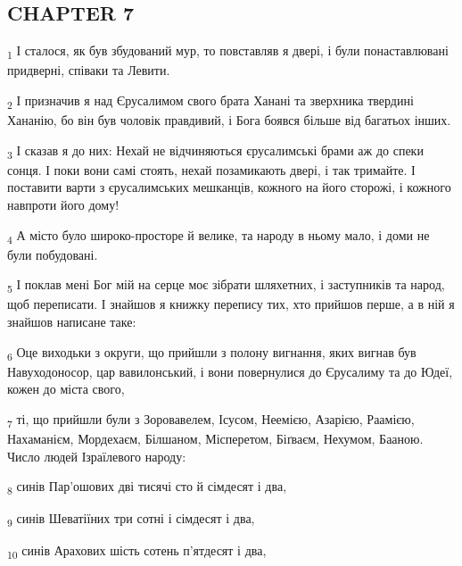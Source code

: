 \subsection{CHAPTER 7}
\begin{tcolorbox}
\textsubscript{1} І сталося, як був збудований мур, то повставляв я двері, і були понаставлювані придверні, співаки та Левити.
\end{tcolorbox}
\begin{tcolorbox}
\textsubscript{2} І призначив я над Єрусалимом свого брата Ханані та зверхника твердині Хананію, бо він був чоловік правдивий, і Бога боявся більше від багатьох інших.
\end{tcolorbox}
\begin{tcolorbox}
\textsubscript{3} І сказав я до них: Нехай не відчиняються єрусалимські брами аж до спеки сонця. І поки вони самі стоять, нехай позамикають двері, і так тримайте. І поставити варти з єрусалимських мешканців, кожного на його сторожі, і кожного навпроти його дому!
\end{tcolorbox}
\begin{tcolorbox}
\textsubscript{4} А місто було широко-просторе й велике, та народу в ньому мало, і доми не були побудовані.
\end{tcolorbox}
\begin{tcolorbox}
\textsubscript{5} І поклав мені Бог мій на серце моє зібрати шляхетних, і заступників та народ, щоб переписати. І знайшов я книжку перепису тих, хто прийшов перше, а в ній я знайшов написане таке:
\end{tcolorbox}
\begin{tcolorbox}
\textsubscript{6} Оце виходьки з округи, що прийшли з полону вигнання, яких вигнав був Навуходоносор, цар вавилонський, і вони повернулися до Єрусалиму та до Юдеї, кожен до міста свого,
\end{tcolorbox}
\begin{tcolorbox}
\textsubscript{7} ті, що прийшли були з Зоровавелем, Ісусом, Неемією, Азарією, Раамією, Нахаманієм, Мордехаєм, Білшаном, Місперетом, Біґваєм, Нехумом, Бааною. Число людей Ізраїлевого народу:
\end{tcolorbox}
\begin{tcolorbox}
\textsubscript{8} синів Пар'ошових дві тисячі сто й сімдесят і два,
\end{tcolorbox}
\begin{tcolorbox}
\textsubscript{9} синів Шеватіїних три сотні і сімдесят і два,
\end{tcolorbox}
\begin{tcolorbox}
\textsubscript{10} синів Арахових шість сотень п'ятдесят і два,
\end{tcolorbox}
